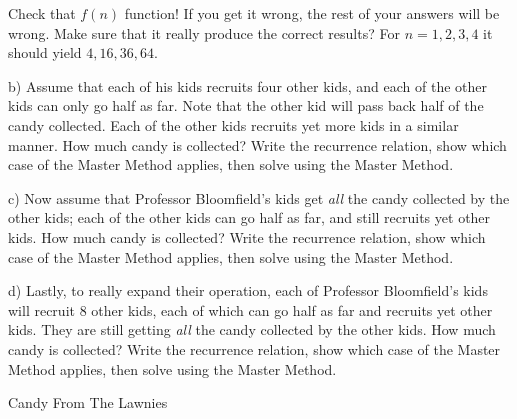 \documentclass[10pt]{article}
\begin{document}
\noindent Check that $f(n)$ function! If you get it wrong, the rest of your answers will be wrong. Make sure that it really produce the correct results?  For $n=1,2,3,4$ it should yield $4,16,36,64$.

\vspace{0.25in}

\noindent b) Assume that each of his kids recruits four other kids, and each of the other kids can only go half as far.  Note that the other kid will pass back half of the candy collected.  Each of the other kids recruits yet more kids in a similar manner.  How much candy is collected? Write the recurrence relation, show which case of the Master Method applies, then solve using the Master Method.

\solution{

}

\vspace{0.25in}

\noindent c) Now assume that Professor Bloomfield's kids get {\em all} the candy collected by the other kids; each of the other kids can go half as far, and still recruits yet other kids.  How much candy is collected? Write the recurrence relation, show which case of the Master Method applies, then solve using the Master Method.

\solution{

}

\vspace{0.25in}

\noindent d) Lastly, to really expand their operation, each of Professor Bloomfield's kids will recruit 8 other kids, each of which can go half as far and recruits yet other kids.  They are still getting {\em all} the candy collected by the other kids.  How much candy is collected? Write the recurrence relation, show which case of the Master Method applies, then solve using the Master Method.

\solution{

}

\begin{problem}Candy From The Lawnies \end{problem}
\end{document}
